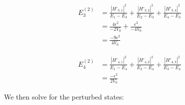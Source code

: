 \documentclass[10pt]{article} %
\begin{document}
\begin{align*}
  E_3^{(2)} &=
  \frac{|H'_{3,1}|^2}{E_1 - E_3} +
  \frac{|H'_{3,2}|^2}{E_2 - E_3} +
  \frac{|H'_{3,4}|^2}{E_4 - E_3}\\
  &= \frac{4\epsilon^2}{-2V_0} + \frac{\epsilon^2}{-4V_0}\\
  &= \frac{-9\epsilon^2}{4V_0}
\end{align*}

\begin{align*}
  E_4^{(2)} &=
  \frac{|H'_{4,1}|^2}{E_1 - E_4} +
  \frac{|H'_{4,2}|^2}{E_2 - E_4} +
  \frac{|H'_{4,3}|^2}{E_3 - E_4}\\
  &= \frac{-\epsilon^2}{2V_0}
\end{align*}

We then solve for the perturbed states: 
\end{document}

